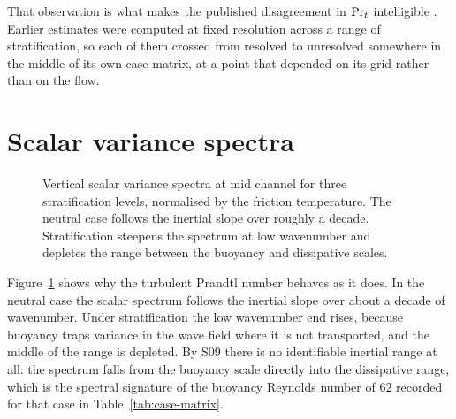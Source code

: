 That observation is what makes the published disagreement in $\mathrm{Pr}_t$
intelligible \citep{duarte2017prandtl}. Earlier estimates were computed at fixed resolution across a range
of stratification, so each of them crossed from resolved to unresolved somewhere
in the middle of its own case matrix, at a point that depended on its grid rather
than on the flow.

\section{Scalar variance spectra}
\label{sec:results-spectra}

\begin{figure}[t]
\centering
{}
\caption[Vertical scalar variance spectra]{Vertical scalar variance spectra at
mid channel for three stratification levels, normalised by the friction
temperature. The neutral case follows the inertial slope over roughly a decade.
Stratification steepens the spectrum at low wavenumber and depletes the range
between the buoyancy and dissipative scales.}
\label{fig:spectra}
\end{figure}

Figure~\ref{fig:spectra} shows why the turbulent Prandtl number behaves as it
does. In the neutral case the scalar spectrum follows the inertial slope over
about a decade of wavenumber. Under stratification the low wavenumber end rises,
because buoyancy traps variance in the wave field where it is not transported,
and the middle of the range is depleted. By S09 there is no identifiable
inertial range at all: the spectrum falls from the buoyancy scale directly into
the dissipative range, which is the spectral signature of the buoyancy Reynolds
number of $62$ recorded for that case in Table~\ref{tab:case-matrix}.

